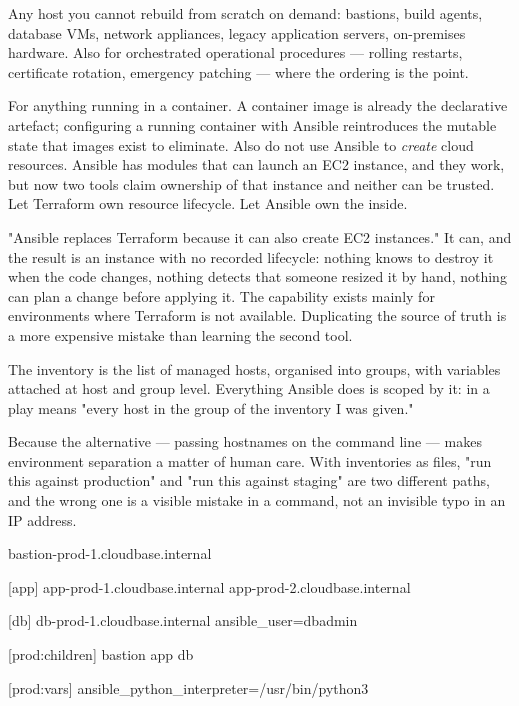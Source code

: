  Any host you cannot rebuild from scratch on demand: bastions, build agents, database VMs, network appliances, legacy application servers, on-premises hardware. Also for orchestrated operational procedures --- rolling restarts, certificate rotation, emergency patching --- where the ordering is the point.

 For anything running in a container. A container image is already the declarative artefact; configuring a running container with Ansible reintroduces the mutable state that images exist to eliminate. Also do not use Ansible to \emph{create} cloud resources. Ansible has  modules that can launch an EC2 instance, and they work, but now two tools claim ownership of that instance and neither can be trusted. Let Terraform own resource lifecycle. Let Ansible own the inside.

\begin{misconception}
"Ansible replaces Terraform because it can also create EC2 instances." It can, and the result is an instance with no recorded lifecycle: nothing knows to destroy it when the code changes, nothing detects that someone resized it by hand, nothing can plan a change before applying it. The capability exists mainly for environments where Terraform is not available. Duplicating the source of truth is a more expensive mistake than learning the second tool.
\end{misconception}


 The inventory is the list of managed hosts, organised into groups, with variables attached at host and group level. Everything Ansible does is scoped by it:  in a play means "every host in the  group of the inventory I was given."

 Because the alternative --- passing hostnames on the command line --- makes environment separation a matter of human care. With inventories as files, "run this against production" and "run this against staging" are two different paths, and the wrong one is a visible mistake in a command, not an invisible typo in an IP address.

\begin{propsbox}
bastion-prod-1.cloudbase.internal

[app]
app-prod-1.cloudbase.internal
app-prod-2.cloudbase.internal

[db]
db-prod-1.cloudbase.internal ansible_user=dbadmin

[prod:children]
bastion
app
db

[prod:vars]
ansible_python_interpreter=/usr/bin/python3
\end{propsbox}

